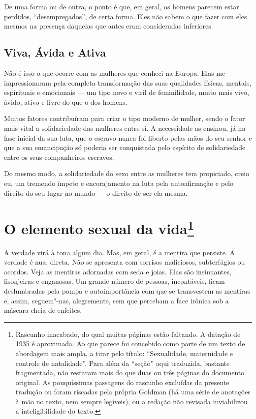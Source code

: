 De uma forma ou de outra, o ponto é que, em geral, os homens parecem
estar perdidos, ``desempregados'', de certa forma. Eles não sabem o que
fazer com eles mesmos na presença daquelas que antes eram consideradas
inferiores.

\section{Viva, Ávida e Ativa}

Não é isso o que ocorre com as mulheres que conheci na Europa. Elas me
impressionaram pela completa transformação das suas qualidades físicas,
mentais, espirituais e emocionais --- um tipo novo e viril de
feminilidade, muito mais vivo, ávido, ativo e livre do que o dos homens.

Muitos fatores contribuíram para criar o tipo moderno de mulher, sendo o
fator mais vital a solidariedade das mulheres entre si. A necessidade as
ensinou, já na fase inicial da sua luta, que o escravo nunca foi liberto
pelas mãos do seu senhor e que a sua emancipação só poderia ser
conquistada pelo espírito de solidariedade entre os seus companheiros
escravos.

Do mesmo modo, a solidariedade do sexo entre as mulheres tem propiciado,
creio eu, um tremendo ímpeto e encorajamento na luta pela autoafirmação
e pelo direito do seu lugar no mundo --- o direito de ser ela mesma.

\chapter{O elemento sexual da vida\footnote[*]{Rascunho inacabado, do qual muitas
  páginas estão faltando. A datação de 1935 é aproximada. Ao que parece foi
  concebido como parte de um texto de abordagem mais ampla, a tirar pelo
  título: ``Sexualidade, maternidade e controle de natalidade''. Para
  além da ``seção'' aqui traduzida, bastante fragmentada, não restaram
  mais do que duas ou três páginas do documento original. As
  pouquíssimas passagens do rascunho excluídas da presente tradução ou
  foram riscadas pela própria Goldman (há uma série de anotações à mão
  no texto, nem sempre legíveis), ou a redação não revisada inviabilizou
  a inteligibilidade do texto.}}


A verdade virá à tona algum dia. Mas, em geral, é a mentira que
persiste. A verdade é nua, direta. Não se apresenta com sorrisos
maliciosos, subterfúgios ou acordos. Veja as mentiras adornadas com seda
e joias. Elas são insinuantes, lisonjeiras e enganosas. Um grande número de pessoas,
incontáveis, ficam deslumbradas pela pompa e autoimportância com que se
transvestem as mentiras e, assim, seguem"-nas, alegremente, sem que percebam
a face irônica sob a máscara cheia de enfeites.

